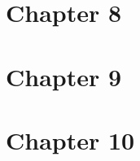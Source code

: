 \documentclass{wileySix}
\begin{document}
\chapter{Chapter 8}
%
%
%
%
%
%
%
%
%
%
%
%
%
%
%
%
%
%
%
%
%
%
%


\chapter{Chapter 9}
%
%
%
%
%
%
%
%
%
%
%
%
%
%
%
%
%
%
%
%
%
%
%
%


\chapter{Chapter 10}
%
%
%
%
%
%
%
%
%
%
%
%
%
%
%
%
%
%
\end{document}
